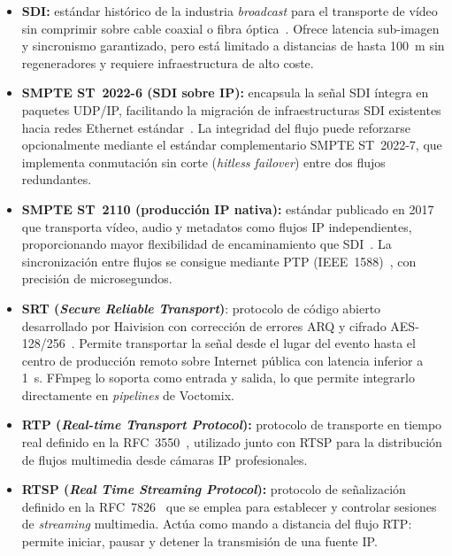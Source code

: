 \begin{itemize}
  \item \textbf{\ac{SDI}:} estándar histórico de la industria \textit{broadcast} para
  el transporte de vídeo sin comprimir sobre cable coaxial o fibra óptica~\cite{smpte_sdi}. Ofrece latencia sub-imagen y sincronismo garantizado,
  pero está limitado a distancias de hasta 100~m sin regeneradores y requiere
  infraestructura de alto coste.

  \item \textbf{\ac{SMPTE} ST~2022-6 (SDI sobre IP):} encapsula la señal SDI íntegra en
  paquetes UDP/IP, facilitando la migración de infraestructuras SDI existentes hacia
  redes Ethernet estándar~\cite{smpte_st2022_6}. La integridad del flujo puede
  reforzarse opcionalmente mediante el estándar complementario SMPTE ST~2022-7,
  que implementa conmutación sin corte (\textit{hitless failover}) entre dos flujos
  redundantes.

  \item \textbf{SMPTE ST~2110 (producción IP nativa):} estándar publicado en 2017 que
  transporta vídeo, audio y metadatos como flujos IP independientes, proporcionando
  mayor flexibilidad de encaminamiento que SDI~\cite{smpte_st2110_20}. La sincronización
  entre flujos se consigue mediante PTP (IEEE~1588)~\cite{ieee1588_ptp}, con precisión
  de microsegundos.

  \item \textbf{SRT (\textit{Secure Reliable Transport})}: protocolo de código abierto
  desarrollado por Haivision con corrección de errores \ac{ARQ} y cifrado \ac{AES}-128/256~\cite{sharabayko2024_srt}.
  Permite transportar la señal desde el lugar del evento hasta el centro de producción
  remoto sobre Internet pública con latencia inferior a 1~s. FFmpeg lo soporta como
  entrada y salida, lo que permite integrarlo directamente en \textit{pipelines} de Voctomix.

  \item \textbf{RTP (\textit{Real-time Transport Protocol}):} protocolo de transporte
  en tiempo real definido en la RFC~3550~\cite{rfc3550_rtp}, utilizado junto con RTSP
  para la distribución de flujos multimedia desde cámaras IP profesionales.

  \item \textbf{RTSP (\textit{Real Time Streaming Protocol}):} protocolo de señalización
  definido en la RFC~7826~\cite{rfc7826_rtsp} que se emplea para establecer y controlar
  sesiones de \textit{streaming} multimedia. Actúa como mando a distancia del flujo RTP:
  permite iniciar, pausar y detener la transmisión de una fuente IP.
\end{itemize}

